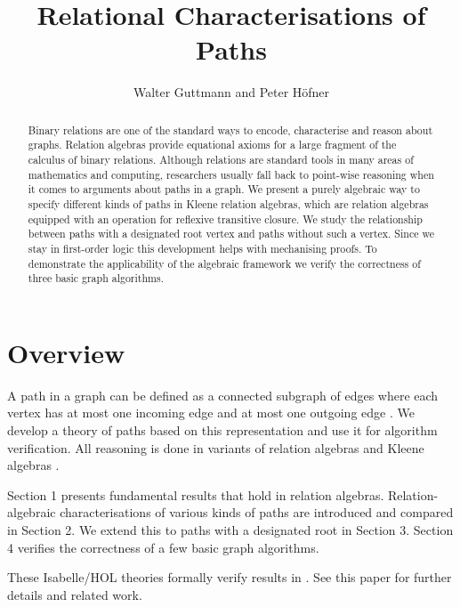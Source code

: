 \documentclass[11pt,a4paper]{article}
\begin{document}
\title{Relational Characterisations of Paths}
\author{Walter Guttmann and Peter H\"ofner}
\maketitle

\begin{abstract}
  Binary relations are one of the standard ways to encode, characterise and reason about graphs.
  Relation algebras provide equational axioms for a large fragment of the calculus of binary relations.
  Although relations are standard tools in many areas of mathematics and computing, researchers usually fall back to point-wise reasoning when it comes to arguments about paths in a graph.
  We present a purely algebraic way to specify different kinds of paths in Kleene relation algebras, which are relation algebras equipped with an operation for reflexive transitive closure.
  We study the relationship between paths with a designated root vertex and paths without such a vertex.
  Since we stay in first-order logic this development helps with mechanising proofs.
  To demonstrate the applicability of the algebraic framework we verify the correctness of three basic graph algorithms.
\end{abstract}

\tableofcontents

\section*{Overview}

A path in a graph can be defined as a connected subgraph of edges where each vertex has at most one incoming edge and at most one outgoing edge \cite{Diestel2005,Tinhofer1976}.
We develop a theory of paths based on this representation and use it for algorithm verification.
All reasoning is done in variants of relation algebras and Kleene algebras \cite{Kozen1994,Ng1984,Tarski1941}.

Section 1 presents fundamental results that hold in relation algebras.
Relation-algebraic characterisations of various kinds of paths are introduced and compared in Section 2.
We extend this to paths with a designated root in Section 3.
Section 4 verifies the correctness of a few basic graph algorithms.

These Isabelle/HOL theories formally verify results in \cite{BerghammerFurusawaGuttmannHoefner2020}.
See this paper for further details and related work.

\begin{flushleft}

\end{flushleft}



\end{document}
